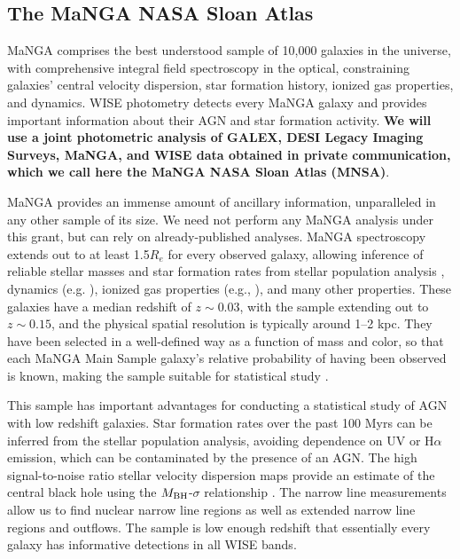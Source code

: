 \documentclass[12pt, preprint]{hacked-aastex}
\begin{document}
\subsection{The MaNGA NASA Sloan Atlas}
\label{sec:mnsa}

MaNGA comprises the best understood sample of 10,000 galaxies in the
universe, with comprehensive integral field spectroscopy in the
optical, constraining galaxies' central velocity dispersion, star
formation history, ionized gas properties, and dynamics. WISE
photometry detects every MaNGA galaxy and provides important
information about their AGN and star formation activity.  {\bf We will
  use a joint photometric analysis of GALEX, DESI Legacy Imaging
  Surveys, MaNGA, and WISE data obtained in private communication,
  which we call here the MaNGA NASA Sloan Atlas (MNSA)}.

MaNGA provides an immense amount of ancillary information,
unparalleled in any other sample of its size. We need not perform any
MaNGA analysis under this grant, but can rely on already-published
analyses. MaNGA spectroscopy extends out to at least 1.5$R_e$ for
every observed galaxy, allowing inference of reliable stellar masses
and star formation rates from stellar population analysis
\cite{sanchez22a}, dynamics (e.g. \cite{graham18a}), ionized gas
properties (e.g., \cite{belfiore17a}), and many other properties.
These galaxies have a median redshift of $z\sim0.03$, with the sample
extending out to $z\sim 0.15$, and the physical spatial resolution is
typically around 1--2 kpc. They have been selected in a well-defined
way as a function of mass and color, so that each MaNGA Main Sample
galaxy's relative probability of having been observed is known, making
the sample suitable for statistical study \cite{wake17a}.

This sample has important advantages for conducting a statistical
study of AGN with low redshift galaxies.  Star formation rates over
the past 100 Myrs can be inferred from the stellar population
analysis, avoiding dependence on UV or H$\alpha$ emission, which can
be contaminated by the presence of an AGN. The high signal-to-noise
ratio stellar velocity dispersion maps provide an estimate of the
central black hole using the $M_{\rm BH}$-$\sigma$ relationship
\cite{kormendy04b}. The narrow line measurements allow us to find
nuclear narrow line regions as well as extended narrow line regions
and outflows. The sample is low enough redshift that essentially every
galaxy has informative detections in all WISE bands.
\end{document}
